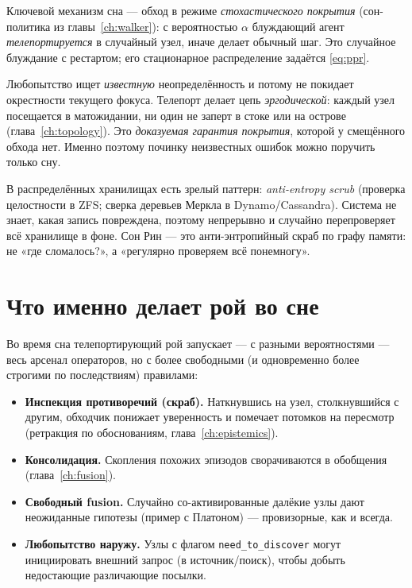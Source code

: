 Ключевой механизм сна — обход в режиме \emph{стохастического покрытия} (сон-политика
из главы~\ref{ch:walker}): с вероятностью $\alpha$ блуждающий агент
\emph{телепортируется} в случайный узел, иначе делает обычный шаг. Это случайное
блуждание с рестартом; его стационарное распределение задаётся \eqref{eq:ppr}.

\begin{principle}
Любопытство ищет \emph{известную} неопределённость и потому не покидает окрестности
текущего фокуса. Телепорт делает цепь \emph{эргодической}: каждый узел посещается в
матожидании, ни один не заперт в стоке или на острове (глава~\ref{ch:topology}). Это
\emph{доказуемая гарантия покрытия}, которой у смещённого обхода нет. Именно поэтому
починку неизвестных ошибок можно поручить только сну.
\end{principle}

\begin{intuition}
В распределённых хранилищах есть зрелый паттерн: \emph{anti-entropy scrub}
(проверка целостности в ZFS; сверка деревьев Меркла в Dynamo/Cassandra). Система не
знает, какая запись повреждена, поэтому непрерывно и случайно перепроверяет всё
хранилище в фоне. Сон Рин — это анти-энтропийный скраб по графу памяти: не «где
сломалось?», а «регулярно проверяем всё понемногу».
\end{intuition}

\section{Что именно делает рой во сне}

Во время сна телепортирующий рой запускает — с разными вероятностями — весь арсенал
операторов, но с более свободными (и одновременно более строгими по последствиям)
правилами:

\begin{itemize}
\item \textbf{Инспекция противоречий (скраб).} Наткнувшись на узел, столкнувшийся с
другим, обходчик понижает уверенность и помечает потомков на пересмотр (ретракция
по обоснованиям, глава~\ref{ch:epistemics}).
\item \textbf{Консолидация.} Скопления похожих эпизодов сворачиваются в обобщения
(глава~\ref{ch:fusion}).
\item \textbf{Свободный fusion.} Случайно со-активированные далёкие узлы дают
неожиданные гипотезы (пример с Платоном) — провизорные, как и всегда.
\item \textbf{Любопытство наружу.} Узлы с флагом \texttt{need\_to\_discover} могут
инициировать внешний запрос (в источник/поиск), чтобы добыть недостающие
различающие посылки.
\end{itemize}

